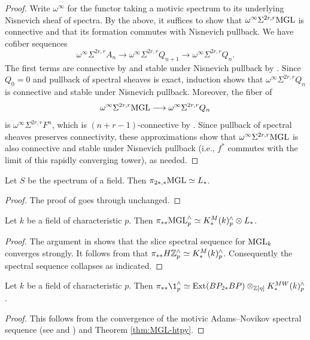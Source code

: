 \documentclass{amsart}
\renewcommand{\NB}[1]{}
\numberwithin{proposition}{section}
\numberwithin{equation}{section}
\def\Ext{\mathrm{Ext}}
\newcommand{\comp}{{{\kern -.5pt}\wedge}}
\begin{document}
\begin{proof}
Write $\omega^\infty$ for the functor taking a motivic spectrum to its underlying Nisnevich sheaf of spectra.
By the above, it suffices to show that $\omega^\infty\Sigma^{2r,r}\mathrm{MGL}$ is connective and that its formation commutes with Nisnevich pullback.
We have cofiber sequences
\[
\omega^\infty\Sigma^{2r,r}A_n
\longrightarrow \omega^\infty\Sigma^{2r,r}Q_{n+1}
\longrightarrow \omega^\infty\Sigma^{2r,r}Q_n.
\]
The first terms are connective by \cite[Corollary~6.24 and Remark~7.2]{bachmann-elmanto-morrow} and stable under Nisnevich pullback by \cite[Proposition~7.4]{bachmann-elmanto-morrow}.
Since $Q_0=0$ and pullback of spectral sheaves is exact, induction shows that $\omega^\infty\Sigma^{2r,r}Q_n$ is connective and stable under Nisnevich pullback.
Moreover, the fiber of
\[
\omega^\infty\Sigma^{2r,r}\mathrm{MGL}
\longrightarrow \omega^\infty\Sigma^{2r,r}Q_n
\]
is $\omega^\infty\Sigma^{2r,r}F^n$, which is $(n+r-1)$-connective by \cite[Proposition~3.44(1)]{bachmann-elmanto-morrow}.
Since pullback of spectral sheaves preserves connectivity, these approximations show that $\omega^\infty\Sigma^{2r,r}\mathrm{MGL}$ is also connective and stable under Nisnevich pullback (i.e., $f^*$ commutes with the limit of this rapidly converging tower), as needed.
\end{proof}

\begin{theorem}
Let $S$ be the spectrum of a field.
Then $\pi_{2*,*}\mathrm{MGL} \simeq L_*$.
\end{theorem}
\begin{proof}
The proof of \cite[Proposition 8.2]{hoyois-algebraic-cobordism} goes through unchanged.
\end{proof}

\begin{theorem} \label{thm:MGL-htpy}
Let $k$ be a field of characteristic $p$.
Then $\pi_{**} \MGL_p^\comp \wequi K_*^M(k)_p^\comp \otimes L_*$.
\end{theorem}
\begin{proof}
The argument in \cite[Lemma 2.40]{bachmann-stems} shows that the slice spectral sequence for $\mathrm{MGL}_k$ converges strongly.
It follows from \cite[Theorem~1.1]{geisser2000k} that $\pi_{**} H\Z_p^\comp \wequi K_*^M(k)_p^\comp$.
Consequently the spectral sequence collapses as indicated.
\end{proof}

\begin{theorem} \label{thm:stable-stems}
Let $k$ be a field of characteristic $p$.
Then $\pi_{**} \1_p^\comp \wequi \Ext(BP_{2*}BP) \otimes_{\Z[\eta]} K_*^{MW}(k)_p^\comp$.
\end{theorem}
\begin{proof}
This follows from the convergence of the motivic Adams--Novikov spectral sequence (see \cite[\S5.1 and Theorem~7.3.4]{mantovani2018localizations} and \cite[Lemma~6.43]{bachmann-resolution}) and Theorem \ref{thm:MGL-htpy}.\NB{details}
\end{proof}
\end{document}
